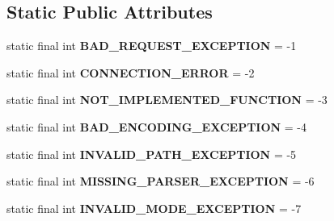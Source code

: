 \subsection*{Static Public Attributes}
\begin{DoxyCompactItemize}
\item 
\hypertarget{classcom_1_1bluevia_1_1commons_1_1exception_1_1BlueviaException_a366987752dddec36bdef2249baffc1ec}{
static final int {\bfseries BAD\_\-REQUEST\_\-EXCEPTION} = -\/1}
\label{classcom_1_1bluevia_1_1commons_1_1exception_1_1BlueviaException_a366987752dddec36bdef2249baffc1ec}

\item 
\hypertarget{classcom_1_1bluevia_1_1commons_1_1exception_1_1BlueviaException_a7a8e15fc29fc875d6c541e0f9643dbae}{
static final int {\bfseries CONNECTION\_\-ERROR} = -\/2}
\label{classcom_1_1bluevia_1_1commons_1_1exception_1_1BlueviaException_a7a8e15fc29fc875d6c541e0f9643dbae}

\item 
\hypertarget{classcom_1_1bluevia_1_1commons_1_1exception_1_1BlueviaException_a6ac1a35c18dd1b5763243cb436aee62f}{
static final int {\bfseries NOT\_\-IMPLEMENTED\_\-FUNCTION} = -\/3}
\label{classcom_1_1bluevia_1_1commons_1_1exception_1_1BlueviaException_a6ac1a35c18dd1b5763243cb436aee62f}

\item 
\hypertarget{classcom_1_1bluevia_1_1commons_1_1exception_1_1BlueviaException_af3b0306bc182fbc9d3a195afc28cbfab}{
static final int {\bfseries BAD\_\-ENCODING\_\-EXCEPTION} = -\/4}
\label{classcom_1_1bluevia_1_1commons_1_1exception_1_1BlueviaException_af3b0306bc182fbc9d3a195afc28cbfab}

\item 
\hypertarget{classcom_1_1bluevia_1_1commons_1_1exception_1_1BlueviaException_ae8d8603abfaa3178b822311d1f56e90c}{
static final int {\bfseries INVALID\_\-PATH\_\-EXCEPTION} = -\/5}
\label{classcom_1_1bluevia_1_1commons_1_1exception_1_1BlueviaException_ae8d8603abfaa3178b822311d1f56e90c}

\item 
\hypertarget{classcom_1_1bluevia_1_1commons_1_1exception_1_1BlueviaException_a9b373fbaa00d6762c6ef7bf50b275c95}{
static final int {\bfseries MISSING\_\-PARSER\_\-EXCEPTION} = -\/6}
\label{classcom_1_1bluevia_1_1commons_1_1exception_1_1BlueviaException_a9b373fbaa00d6762c6ef7bf50b275c95}

\item 
\hypertarget{classcom_1_1bluevia_1_1commons_1_1exception_1_1BlueviaException_a028907118c5b32bade6c793224fa8226}{
static final int {\bfseries INVALID\_\-MODE\_\-EXCEPTION} = -\/7}
\label{classcom_1_1bluevia_1_1commons_1_1exception_1_1BlueviaException_a028907118c5b32bade6c793224fa8226}


\end{DoxyCompactItemize}
